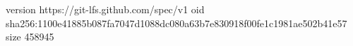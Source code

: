 version https://git-lfs.github.com/spec/v1
oid sha256:1100e41885b087fa7047d1088dc080a63b7e830918f00fe1c1981ae502b41e57
size 458945
